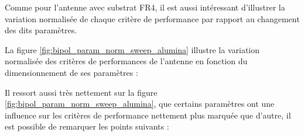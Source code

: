 \documentclass[Deriaz_Traiber_Labo02]{subfiles}
\begin{document}
Comme pour l'antenne avec substrat FR4, il est aussi intéressant d'illustrer la variation normalisée de chaque critère de performance par rapport au changement des dits paramètres.\\

\pagebreak

La figure \ref{fig:bipol_param_norm_sweep_alumina} illustre la variation normalisée des critères de performances de l'antenne en fonction du dimensionnement de ses paramètres :


Il ressort aussi très nettement sur la figure \ref{fig:bipol_param_norm_sweep_alumina}, que certains paramètres ont une influence sur les critères de performance nettement plus marquée que d'autre, il est possible de remarquer les points suivants :\\
\end{document}
